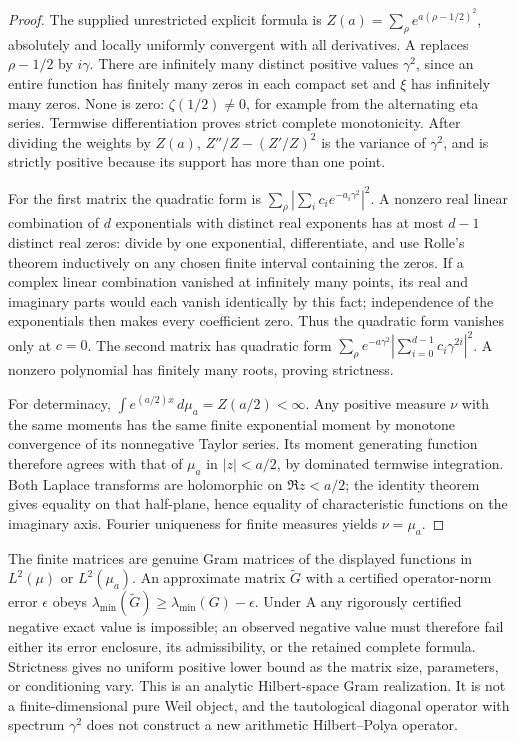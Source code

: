 \begin{proof}
The supplied unrestricted explicit formula is
$Z(a)=\sum_\rho e^{a(\rho-1/2)^2}$, absolutely and locally uniformly
convergent with all derivatives. A replaces $\rho-1/2$ by $i\gamma$.
There are infinitely many distinct positive values $\gamma^2$, since
an entire function has finitely many zeros in each compact set and
$\xi$ has infinitely many zeros. None is zero: $\zeta(1/2)\ne0$,
for example from the alternating eta series.
Termwise differentiation proves strict complete monotonicity.
After dividing the weights by $Z(a)$,
$Z''/Z-(Z'/Z)^2$ is the variance of $\gamma^2$, and is strictly
positive because its support has more than one point.

For the first matrix the quadratic form is
$\sum_\rho|\sum_i c_i e^{-a_i\gamma^2}|^2$.
A nonzero real linear combination of $d$ exponentials with distinct
real exponents has at most $d-1$ distinct real zeros: divide by one
exponential, differentiate, and use Rolle's theorem inductively on
any chosen finite interval containing the zeros. If a complex linear
combination vanished at infinitely many points, its real and imaginary
parts would each vanish identically by this fact; independence of the
exponentials then makes every coefficient zero. Thus the quadratic form
vanishes only at $c=0$. The second matrix has quadratic form
$\sum_\rho e^{-a\gamma^2}|\sum_{i=0}^{d-1}c_i\gamma^{2i}|^2$.
A nonzero polynomial has finitely many roots, proving strictness.

For determinacy, $\int e^{(a/2)x}\,d\mu_a=Z(a/2)<\infty$.
Any positive measure $\nu$ with the same moments has the same finite
exponential moment by monotone convergence of its nonnegative Taylor
series. Its moment generating function therefore agrees with that of
$\mu_a$ in $|z|<a/2$, by dominated termwise integration. Both Laplace
transforms are holomorphic on $\Re z<a/2$; the identity theorem gives
equality on that half-plane, hence equality of characteristic functions
on the imaginary axis. Fourier uniqueness for finite measures yields
$\nu=\mu_a$.
\end{proof}

The finite matrices are genuine Gram matrices of the displayed functions
in $L^2(\mu)$ or $L^2(\mu_a)$. An approximate matrix
$\widetilde G$ with a certified operator-norm error $\epsilon$ obeys
$\lambda_{\min}(\widetilde G)\ge\lambda_{\min}(G)-\epsilon$.
Under A any rigorously certified negative exact value is impossible;
an observed negative value must therefore fail either its error
enclosure, its admissibility, or the retained complete formula.
Strictness gives no uniform positive lower bound as the matrix size,
parameters, or conditioning vary. This is an analytic Hilbert-space
Gram realization. It is not a finite-dimensional pure Weil object,
and the tautological diagonal operator with spectrum $\gamma^2$
does not construct a new arithmetic Hilbert--Polya operator.



